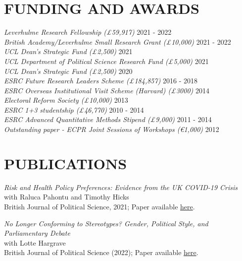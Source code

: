 \documentclass[centered]{res}
\begin{document}
\begin{resume}
\section{FUNDING AND AWARDS} 

\vspace{.5cm}

 {
 {\sl Leverhulme Research Fellowship (\pounds 59,917)} \hfill 2021 - 2022 \\
{\sl British Academy/Leverhulme Small Research Grant  (\pounds 10,000)} \hfill 2021 - 2022 \\
{\sl UCL Dean's Strategic Fund (\pounds 2,500)} \hfill 2021 \\
{\sl UCL Department of Political Science Research Fund (\pounds 5,000)} \hfill 2021 \\
{\sl UCL Dean's Strategic Fund (\pounds 2,500)} \hfill 2020 \\
{\sl ESRC Future Research Leaders Scheme (\pounds 184,857)} \hfill 2016 - 2018 \\
{\sl ESRC Overseas Institutional Visit Scheme (Harvard) (\pounds 3000)} \hfill 2014 \\
{\sl Electoral Reform Society (\pounds 10,000)} \hfill 2013 \\
{\sl ESRC 1+3 studentship (\pounds 46,770)} \hfill 2010 - 2014 \\
{\sl ESRC Advanced Quantitative Methods Stipend (\pounds 9,000)} \hfill 2011 - 2014 \\
{\sl Outstanding paper - ECPR Joint Sessions of Workshops (\euro 1,000)} \hfill 2012 
}


\section{PUBLICATIONS} 

\vspace{.5cm}

{\sl Risk and Health Policy Preferences: Evidence from the UK COVID-19 Crisis} \\
with Raluca Pahontu and Timothy Hicks \\
British Journal of Political Science, 2021; Paper available \href{http://www.jackblumenau.com/papers/covid_risk.pdf} {here}.

{\sl No Longer Conforming to Stereotypes? Gender, Political Style, and Parliamentary Debate} \\
with Lotte Hargrave\\
British Journal of Political Science (2022); Paper available \href{https://www.jackblumenau.com/papers/gender_styles.pdf} {here}.


\end{resume}
\end{document}
